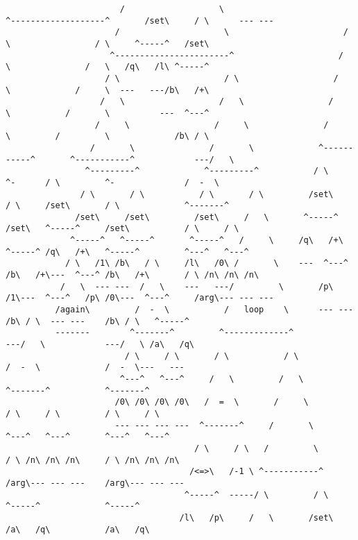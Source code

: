 \documentclass[aip,jcp,reprint,footinbib]{revtex4-1}
\begin{document}
\begin{lstlisting}
                       /                   \                         ^-------------------^       /set\     / \      --- ---
                      /                     \                       / \                 / \     ^-----^   /set\
                     ^-----------------------^                     /   \               /   \   /q\   /l\ ^-----^
                    / \                     / \                   /     \             /     \  ---   ---/b\   /+\
                   /   \                   /   \                 /       \           /       \          ---  ^---^
                  /     \                 /     \               /         \         /         \             /b\ / \
                 /       \               /       \             ^-----------^       ^-----------^            ---/   \
                ^---------^             ^---------^           / \         ^-      / \         ^-              /  -  \
               / \       / \           / \       / \         /set\       / \     /set\       / \             ^-------^
              /set\     /set\         /set\     /   \       ^-----^     /set\   ^-----^     /set\           / \     / \
             ^-----^   ^-----^       ^-----^   /     \     /q\   /+\   ^-----^ /q\   /+\   ^-----^         ^---^   ^---^
            / \   /1\ /b\   / \     /l\   /0\ /       \    ---  ^---^ /b\   /+\---  ^---^ /b\   /+\       / \ /n\ /n\ /n\
           /   \  --- ---  /   \    ---   ---/         \       /p\ /1\---  ^---^   /p\ /0\---  ^---^     /arg\--- --- ---
          /again\         /  -  \           /   loop    \      --- ---    /b\ / \  --- ---    /b\ / \   ^-----^
          -------        ^-------^         ^-------------^                ---/   \            ---/   \ /a\   /q\
                        / \     / \       / \           / \                 /  -  \             /  -  \---   ---
                       ^---^   ^---^     /   \         /   \               ^-------^           ^-------^
                      /0\ /0\ /0\ /0\   /  =  \       /     \             / \     / \         / \     / \
                      --- --- --- ---  ^-------^     /       \           ^---^   ^---^       ^---^   ^---^
                                      / \     / \   /         \         / \ /n\ /n\ /n\     / \ /n\ /n\ /n\
                                     /<=>\   /-1 \ ^-----------^       /arg\--- --- ---    /arg\--- --- ---
                                    ^-----^  -----/ \         / \     ^-----^             ^-----^
                                   /l\   /p\     /   \       /set\   /a\   /q\           /a\   /q\

\end{lstlisting}
\end{document}

